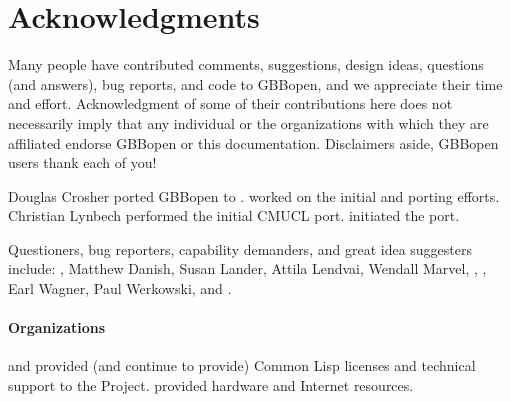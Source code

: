 


\section*{Acknowledgments}
\T{}%
\label{sec:acknowledgments}%
%

Many people have contributed comments, suggestions, design ideas, questions
(and answers), bug reports, and code to GBBopen, and we appreciate their time
and effort.  Acknowledgment of some of their contributions here does not
necessarily imply that any individual or the organizations with which they are
affiliated endorse GBBopen or this documentation.  Disclaimers aside, GBBopen
users thank each of you!

Douglas Crosher ported GBBopen to .   worked on the initial  and
 porting efforts.
Christian Lynbech performed the initial CMUCL port.   initiated the
 port.

Questioners, bug reporters, capability demanders, and great idea suggesters
include: , Matthew Danish, Susan
Lander, Attila Lendvai, Wendall Marvel, , , Earl Wagner, Paul Werkowski, and
.

\paragraph{Organizations}

 and  provided (and continue to provide)
Common Lisp licenses and technical support to the Project.
 provided hardware
and Internet resources.  

